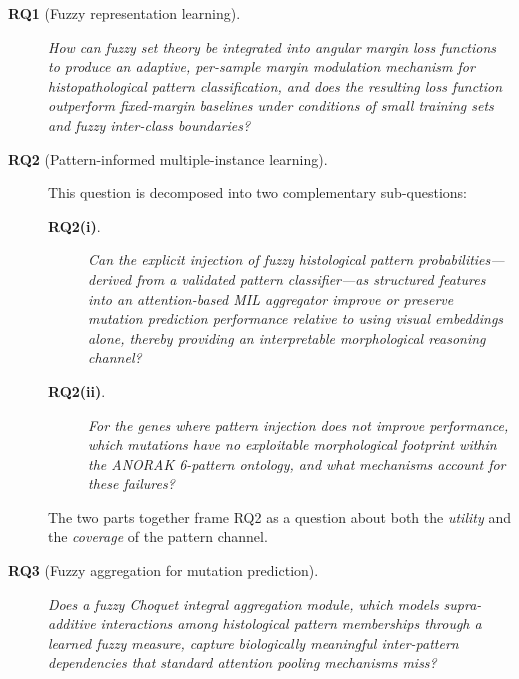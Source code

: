 \begin{description}
    \item[\textbf{RQ1} (Fuzzy representation learning).]  \emph{How can fuzzy set theory be integrated into angular margin loss functions to produce an adaptive, per-sample margin modulation mechanism for histopathological pattern classification, and does the resulting loss function outperform fixed-margin baselines under conditions of small training sets and fuzzy inter-class boundaries?}

    \item[\textbf{RQ2} (Pattern-informed multiple-instance learning).]
    This question is decomposed into two complementary sub-questions:
    \begin{description}
        \item[\textbf{RQ2(i)}.]
        \emph{Can the explicit injection of fuzzy histological pattern
        probabilities---derived from a validated pattern classifier---as
        structured features into an attention-based MIL aggregator
        improve or preserve mutation prediction performance relative to
        using visual embeddings alone, thereby providing an interpretable
        morphological reasoning channel?}
        \item[\textbf{RQ2(ii)}.]
        \emph{For the genes where pattern injection does not improve
        performance, which mutations have no exploitable morphological
        footprint within the ANORAK 6-pattern ontology, and what
        mechanisms account for these failures?}
    \end{description}
    The two parts together frame RQ2 as a question about both the
    \emph{utility} and the \emph{coverage} of the pattern channel.

    \item[\textbf{RQ3} (Fuzzy aggregation for mutation prediction).]  \emph{Does a fuzzy Choquet integral aggregation module, which models supra-additive interactions among histological pattern memberships through a learned fuzzy measure, capture biologically meaningful inter-pattern dependencies that standard attention pooling mechanisms miss?}


\end{description}
